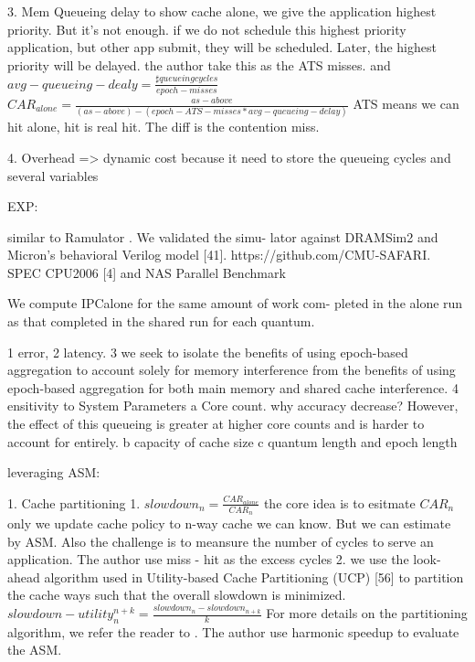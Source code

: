 \documentclass[8pt,UTF8]{article}
\begin{document}
                3. Mem Queueing delay to show cache alone, we give the application highest priority. But it's not enough. if we do not schedule this highest priority application, but other app submit, they will be scheduled. Later, the highest priority will be delayed. the author take this as the ATS misses. and $avg-queueing-dealy = \frac{\sharp queueing cycles}{epoch-misses}$ $CAR_{alone} = \frac{as-above}{(as-above) - (epoch-ATS-misses*avg-queueing-delay)}$ ATS means we can hit alone, hit is real hit. The diff is the contention miss.
                
                4. Overhead => dynamic cost because it need to store the queueing cycles and several variables
                
                EXP:
                
                similar to Ramulator \cite{kim2015ramulator}. We validated the simu- lator against DRAMSim2 \cite{rosenfeld2011dramsim2} and Micron’s behavioral Verilog model [41]. https://github.com/CMU-SAFARI. SPEC CPU2006 [4] and NAS Parallel Benchmark
                
                We compute IPCalone for the same amount of work com- pleted in the alone run as that completed in the shared run for each quantum.
                
                1 error,  2 latency. 3 we seek to isolate the benefits of using epoch-based aggregation to account solely for memory interference from the benefits of using epoch-based aggregation for both main memory and shared cache interference. 4 ensitivity to System Parameters a Core count. why accuracy decrease? However, the effect of this queueing is greater at higher core counts and is harder to account for entirely. b capacity of cache size c quantum length and epoch length
                
                leveraging ASM:
                
                1. Cache partitioning 1. $slowdown_n = \frac{CAR_{alone}}{CAR_n}$  the core idea is to esitmate $CAR_n$ only we update cache policy to n-way cache we can know. But we can estimate by ASM. Also the challenge is to meansure the number of cycles to serve an application. The author use miss - hit as the excess cycles 2. we use the look-ahead algorithm used in Utility-based Cache Partitioning (UCP) [56] to partition the cache ways such that the overall slowdown is minimized. $slowdown-utility^{n+k}_n = \frac{slowdown_n - slowdown_{n+k}}{k}$  For more details on the partitioning algorithm, we refer the reader to \cite{qureshi2006utility}. The author use harmonic speedup to evaluate the ASM.
                
\end{document}
